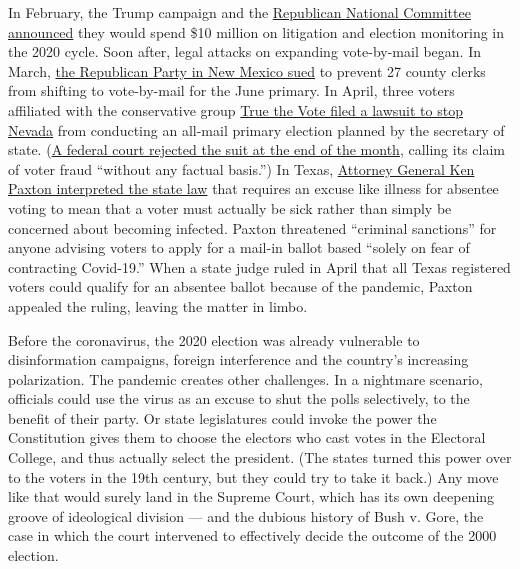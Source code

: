 In February, the Trump campaign and the
\href{https://www.politico.com/news/2020/02/20/michigan-voting-lawsuits-rnc-trump-116142}{Republican
National Committee announced} they would spend \$10 million on
litigation and election monitoring in the 2020 cycle. Soon after, legal
attacks on expanding vote-by-mail began. In March,
\href{https://www.krwg.org/post/new-mexico-republicans-file-lawsuit-have-supreme-court-block-mail-primary}{the
Republican Party in New Mexico sued} to prevent 27 county clerks from
shifting to vote-by-mail for the June primary. In April, three voters
affiliated with the conservative group
\href{https://thenevadaindependent.com/article/another-lawsuit-filed-against-planned-mail-only-primary-election-by-conservative-voting-monitoring-group}{True
the Vote filed a lawsuit to stop Nevada} from conducting an all-mail
primary election planned by the secretary of state.
(\href{https://www.courthousenews.com/wp-content/uploads/2020/04/order.pdf}{A
federal court rejected the suit at the end of the month}, calling its
claim of voter fraud ``without any factual basis.'') In Texas,
\href{https://www.texasattorneygeneral.gov/sites/default/files/images/admin/2020/Press/4.14.20\%20Letter\%20to\%20Rep.\%20Klick.pdf}{Attorney
General Ken Paxton interpreted the state law} that requires an excuse
like illness for absentee voting to mean that a voter must actually be
sick rather than simply be concerned about becoming infected. Paxton
threatened ``criminal sanctions'' for anyone advising voters to apply
for a mail-in ballot based ``solely on fear of contracting Covid-19.''
When a state judge ruled in April that all Texas registered voters could
qualify for an absentee ballot because of the pandemic, Paxton appealed
the ruling, leaving the matter in limbo.

Before the coronavirus, the 2020 election was already vulnerable to
disinformation campaigns, foreign interference and the country's
increasing polarization. The pandemic creates other challenges. In a
nightmare scenario, officials could use the virus as an excuse to shut
the polls selectively, to the benefit of their party. Or state
legislatures could invoke the power the Constitution gives them to
choose the electors who cast votes in the Electoral College, and thus
actually select the president. (The states turned this power over to the
voters in the 19th century, but they could try to take it back.) Any
move like that would surely land in the Supreme Court, which has its own
deepening groove of ideological division --- and the dubious history of
Bush v. Gore, the case in which the court intervened to effectively
decide the outcome of the 2000 election.

